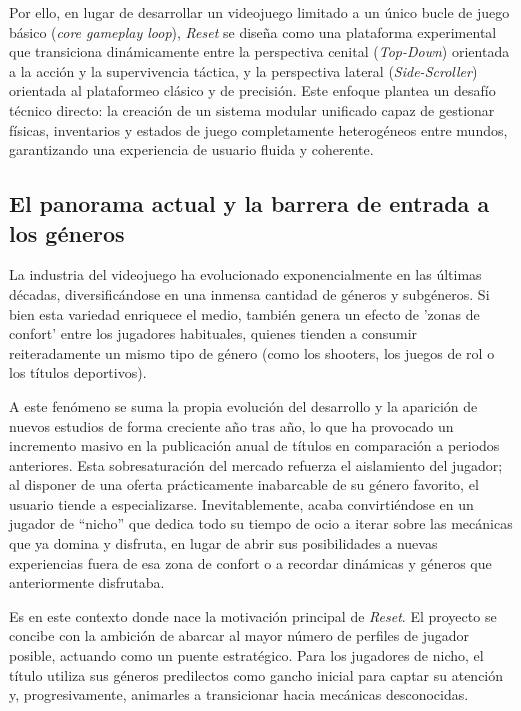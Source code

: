 Por ello, en lugar de desarrollar un videojuego limitado a un único bucle de juego básico (\textit{core gameplay loop}), \textit{Reset} se diseña como una plataforma experimental que transiciona dinámicamente entre la perspectiva cenital (\textit{Top-Down}) orientada a la acción y la supervivencia táctica, y la perspectiva lateral (\textit{Side-Scroller}) orientada al plataformeo clásico y de precisión. Este enfoque plantea un desafío técnico directo: la creación de un sistema modular unificado capaz de gestionar físicas, inventarios y estados de juego completamente heterogéneos entre mundos, garantizando una experiencia de usuario fluida y coherente.

\subsection{El panorama actual y la barrera de entrada a los géneros}

La industria del videojuego ha evolucionado exponencialmente en las últimas décadas, diversificándose en una inmensa cantidad de géneros y subgéneros. Si bien esta variedad enriquece el medio, también genera un efecto de 'zonas de confort' entre los jugadores habituales, quienes tienden a consumir reiteradamente un mismo tipo de género (como los shooters, los juegos de rol o los títulos deportivos).

A este fenómeno se suma la propia evolución del desarrollo y la aparición de nuevos estudios de forma creciente año tras año, lo que ha provocado un incremento masivo en la publicación anual de títulos en comparación a periodos anteriores. Esta sobresaturación del mercado refuerza el aislamiento del jugador; al disponer de una oferta prácticamente inabarcable de su género favorito, el usuario tiende a especializarse. Inevitablemente, acaba convirtiéndose en un jugador de ``nicho'' que dedica todo su tiempo de ocio a iterar sobre las mecánicas que ya domina y disfruta, en lugar de abrir sus posibilidades a nuevas experiencias fuera de esa zona de confort o a recordar dinámicas y géneros que anteriormente disfrutaba.

Es en este contexto donde nace la motivación principal de \textit{Reset}. El proyecto se concibe con la ambición de abarcar al mayor número de perfiles de jugador posible, actuando como un puente estratégico. Para los jugadores de nicho, el título utiliza sus géneros predilectos como gancho inicial para captar su atención y, progresivamente, animarles a transicionar hacia mecánicas desconocidas.


